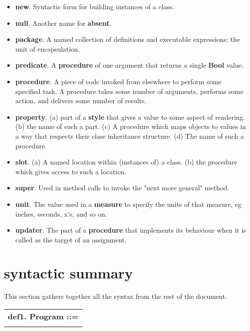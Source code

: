 \documentclass{report}
\begin{document}
\begin{itemize}
\item {\bf new}. Syntactic form for building instances of a class.

\item {\bf null}. Another name for {\bf absent}.

\item {\bf package}. A named collection of definitions and executable expressions; the
unit of encapsulation.

\item {\bf predicate}. A {\bf procedure} of one argument that returns a single {\bf Bool} value.

\item {\bf procedure}. A piece of code invoked from elsewhere to perform some specified
task. A procedure takes some number of arguments, performs some action,
and delivers some number of results.

\item {\bf property}. (a) part of a {\bf style} that gives a value to some aspect of
rendering. (b) the name of such a part. (c) A procedure which maps objects to
values in a way that respects their class inheritance structure. (d) The name
of such a procedure.

\item {\bf slot}. (a) A named location within (instances of) a class. (b) the procedure
which gives access to such a location.

\item {\bf super}. Used in method calls to invoke the "next more general" method.

\item {\bf unit}. The value used in a {\bf measure} to specify the units of that measure,
eg inches, seconds, x's, and so on.

\item {\bf updater}. The part of a {\bf procedure} that implements its behaviour when it is
called as the target of an assignment.

\end{itemize}\chapter{syntactic summary}


This section gathers together all the syntax from the rest of the document.

\begin{tabular}{l}
{\bf def1. Program ::= }\\ 
\hspace*{3mm}{\tt Spice (Package* $\mid$ PackageBody)} \\ 
\end{tabular}
\end{document}
